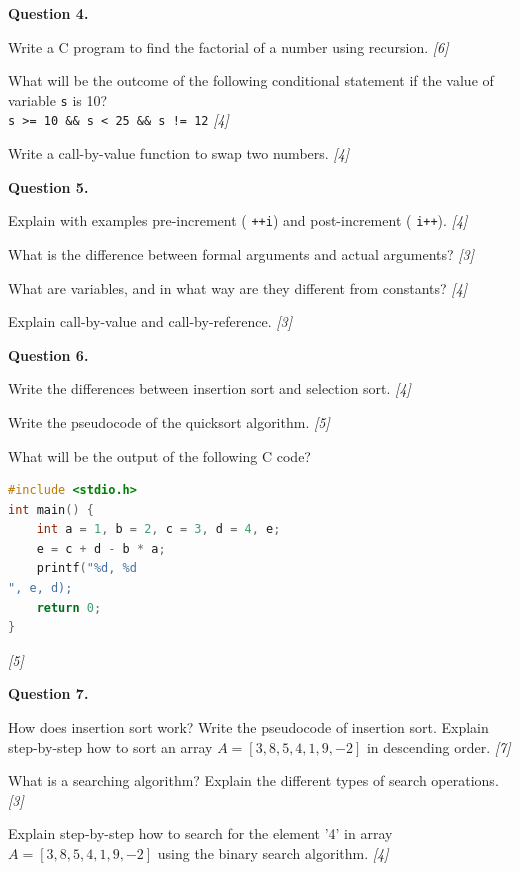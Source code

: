 \documentclass[11pt,a4paper]{article}
\newcommand{\pts}[1]{\hfill   \textit{[#1]}}
\begin{document}
\medskip


\noindent   \textbf{Question 4.}

\begin{parts}
  \item Write a C program to find the factorial of a number using recursion. \pts{6}
  \item What will be the outcome of the following conditional statement if the value of variable   \texttt{s} is 10? \\
   \texttt{s >= 10 \&\& s < 25 \&\& s != 12} \pts{4}
  \item Write a call-by-value function to swap two numbers. \pts{4}
\end{parts}

\medskip


\noindent   \textbf{Question 5.}

\begin{parts}
  \item Explain with examples pre-increment (   \texttt{++i}) and post-increment (   \texttt{i++}). \pts{4}
  \item What is the difference between formal arguments and actual arguments? \pts{3}
  \item What are variables, and in what way are they different from constants? \pts{4}
  \item Explain call-by-value and call-by-reference. \pts{3}
\end{parts}

\medskip


\noindent   \textbf{Question 6.}

\begin{parts}
  \item Write the differences between insertion sort and selection sort. \pts{4}
  \item Write the pseudocode of the quicksort algorithm. \pts{5}
  \item What will be the output of the following C code?
  
\begin{lstlisting}[language=C]
#include <stdio.h>
int main() {
    int a = 1, b = 2, c = 3, d = 4, e;
    e = c + d - b * a;
    printf("%d, %d
", e, d);
    return 0;
}
  \end{lstlisting} \pts{5}
\end{parts}

\medskip


\noindent   \textbf{Question 7.}

\begin{parts}
  \item How does insertion sort work? Write the pseudocode of insertion sort. Explain step-by-step how to sort an array $A = [3, 8, 5, 4, 1, 9, -2]$ in descending order. \pts{7}
  \item What is a searching algorithm? Explain the different types of search operations. \pts{3}
  \item Explain step-by-step how to search for the element '4' in array $A = [3, 8, 5, 4, 1, 9, -2]$ using the binary search algorithm. \pts{4}
\end{parts}
\end{document}
